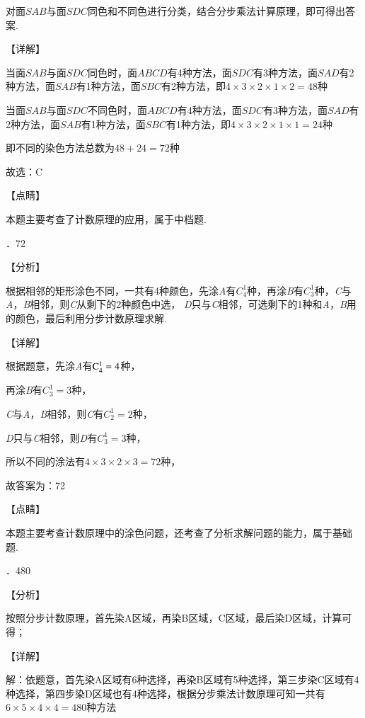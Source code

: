 \documentclass[a4paper,11pt,UTF8,twoside]{ctexart} %
\begin{document}
\noindent 对面$SAB$与面$SDC$同色和不同色进行分类，结合分步乘法计算原理，即可得出答案.

\noindent 【详解】

\noindent 当面$SAB$与面$SDC$同色时，面$ABCD$有4种方法，面$SDC$有3种方法，面$SAD$有2种方法，面$SAB$有1种方法，面$SBC$有2种方法，即$4\times 3\times 2\times 1\times 2=48$种

\noindent 当面$SAB$与面$SDC$不同色时，面$ABCD$有4种方法，面$SDC$有3种方法，面$SAD$有2种方法，面$SAB$有1种方法，面$SBC$有1种方法，即$4\times 3\times 2\times 1\times 1=24$种

\noindent 即不同的染色方法总数为$48+24=72$种

\noindent 故选：C

\noindent 【点睛】

\noindent 本题主要考查了计数原理的应用，属于中档题.

．72

\noindent 【分析】

\noindent 根据相邻的矩形涂色不同，一共有4种颜色，先涂\textit{A}有$C_{4}^{1} $种，再涂\textit{B}有$C_{3}^{1} $种，\textit{C}与\textit{A}，\textit{B}相邻，则\textit{C}从剩下的2种颜色中选，\textit{ D}只与\textit{C}相邻，可选剩下的1种和\textit{A}，\textit{B}用的颜色，最后利用分步计数原理求解.

\noindent 【详解】

\noindent 根据题意，先涂\textit{A}有${\rm C}_{4}^{1} =4$种，

\noindent 再涂\textit{B}有$C_{3}^{1} =3$种，

\noindent \textit{C}与\textit{A}，\textit{B}相邻，则\textit{C}有$C_{2}^{1} =2$种，

\noindent \textit{D}只与\textit{C}相邻，则\textit{D}有$C_{3}^{1} =3$种，

\noindent 所以不同的涂法有$4\times 3\times 2\times 3=72$种，

\noindent 故答案为：72

\noindent 【点睛】

\noindent 本题主要考查计数原理中的涂色问题，还考查了分析求解问题的能力，属于基础题.

．480

\noindent 【分析】

\noindent 按照分步计数原理，首先染A区域，再染B区域，C区域，最后染D区域，计算可得；

\noindent 【详解】

\noindent 解：依题意，首先染A区域有$6$种选择，再染B区域有5种选择，第三步染C区域有4种选择，第四步染D区域也有4种选择，根据分步乘法计数原理可知一共有$6\times 5\times 4\times 4=480$种方法
\end{document}
